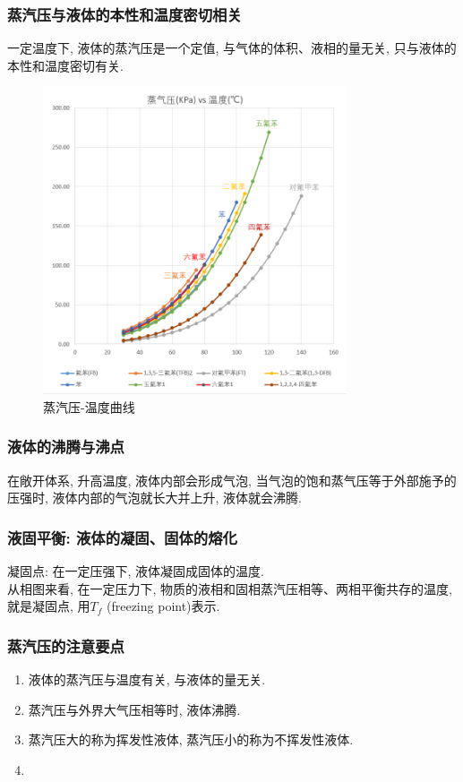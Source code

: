 \documentclass[12pt, a4paper, oneside]{ctexbook}
\begin{document}
\subsubsection*{蒸汽压与液体的本性和温度密切相关}
一定温度下, 液体的蒸汽压是一个定值, 与气体的体积、液相的量无关, 只与液体的本性和温度密切有关. 
\begin{figure}[htbp]
    \centering
    \includegraphics[width=0.8\textwidth]{pics/vapor_pressure.png}
    \caption{蒸汽压-温度曲线}
\end{figure}

\newpage
\subsubsection{液体的沸腾与沸点}
在敞开体系, 升高温度, 液体内部会形成气泡, 当气泡的饱和蒸气压等于外部施予的压强时, 液体内部的气泡就长大并上升, 液体就会沸腾. \\
\subsubsection{液固平衡: 液体的凝固、固体的熔化}
凝固点: 在一定压强下, 液体凝固成固体的温度. \\
从相图来看, 在一定压力下, 物质的液相和固相蒸汽压相等、两相平衡共存的温度, 就是凝固点, 用$T_f$ (freezing point)表示. \\

\subsubsection{蒸汽压的注意要点}
\begin{enumerate}
    \item 液体的蒸汽压与温度有关, 与液体的量无关. 
    \item 蒸汽压与外界大气压相等时, 液体沸腾. 
    \item 蒸汽压大的称为挥发性液体, 蒸汽压小的称为不挥发性液体. 
    \item 
\end{enumerate}
\end{document}
